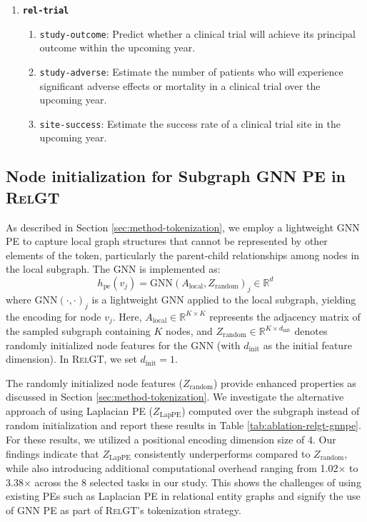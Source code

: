 \documentclass{article} %
\newcommand{\RelGT}{\textsc{RelGT}\xspace}
\begin{document}
\begin{enumerate}
\item \textbf{\texttt{rel-trial}}
  \begin{enumerate}
    \item \texttt{\texttt{study-outcome}}: Predict whether a clinical trial will achieve its principal outcome within the upcoming year.
    \item \texttt{\texttt{study-adverse}}: Estimate the number of patients who will experience significant adverse effects or mortality in a clinical trial over the upcoming year.
    \item \texttt{\texttt{site-success}}: Estimate the success rate of a clinical trial site in the upcoming year.
  \end{enumerate}
\end{enumerate}



\subsection{Node initialization for Subgraph GNN PE in \RelGT}
As described in Section \ref{sec:method-tokenization}, we employ a lightweight GNN PE to capture local graph structures that cannot be represented by other elements of the token, particularly the parent-child relationships among nodes in the local subgraph. 
The GNN is implemented as:
\begin{equation}
  h_{\text{pe}}(v_j) = \text{GNN}(A_{\text{local}}, Z_{\text{random}})_j \in \mathbb{R}^d \label{eq:pe_enc_sep_app}
\end{equation}
where $\text{GNN}(\cdot, \cdot)_j$ is a lightweight GNN applied to the local subgraph, yielding the encoding for node $v_j$. Here, $A_{\text{local}} \in \mathbb{R}^{K \times K}$ represents the adjacency matrix of the sampled subgraph containing $K$ nodes, and $Z_{\text{random}} \in \mathbb{R}^{K \times d_{\text{init}}}$ denotes randomly initialized node features for the GNN (with $d_{\text{init}}$ as the initial feature dimension). In \RelGT, we set $d_{\text{init}}=1$.

The randomly initialized node features ($Z_{\text{random}}$) provide enhanced properties as discussed in Section \ref{sec:method-tokenization}. We investigate the alternative approach of using Laplacian PE ($Z_{\text{LapPE}}$) computed over the subgraph instead of random initialization and report these results in Table \ref{tab:ablation-relgt-gnnpe}. For these results, we utilized a positional encoding dimension size of $4$. Our findings indicate that $Z_{\text{LapPE}}$ consistently underperforms compared to $Z_{\text{random}}$, while also introducing additional computational overhead ranging from 1.02$\times$ to 3.38$\times$ across the 8 selected tasks in our study. This shows the challenges of using existing PEs such as Laplacian PE in relational entity graphs and signify the use of GNN PE as part of \RelGT's tokenization strategy.
\end{document}
